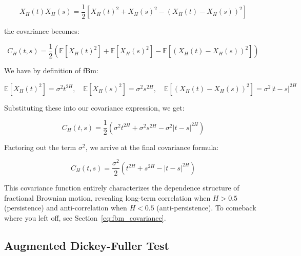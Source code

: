 \documentclass[11pt]{extarticle}
\begin{document}
\[
X_H(t)X_H(s) = \frac{1}{2}\left[X_H(t)^2 + X_H(s)^2 - (X_H(t)-X_H(s))^2\right]
\]

the covariance becomes:

\[
C_H(t,s) = \frac{1}{2}\left(\mathbb{E}[X_H(t)^2]+\mathbb{E}[X_H(s)^2]-\mathbb{E}[(X_H(t)-X_H(s))^2]\right)
\]


We have by definition of fBm:

\[
\mathbb{E}[X_H(t)^2] = \sigma^2 t^{2H}, \quad \mathbb{E}[X_H(s)^2] = \sigma^2 s^{2H}, \quad \mathbb{E}[(X_H(t)-X_H(s))^2] = \sigma^2 |t-s|^{2H}
\]

Substituting these into our covariance expression, we get:

\[
C_H(t,s) = \frac{1}{2}\left(\sigma^2 t^{2H} + \sigma^2 s^{2H} - \sigma^2 |t-s|^{2H}\right)
\]


Factoring out the term \( \sigma^2 \), we arrive at the final covariance formula:

\[
\boxed{C_H(t,s) = \frac{\sigma^2}{2}\left(t^{2H} + s^{2H} - |t-s|^{2H}\right)}
\]

This covariance function entirely characterizes the dependence structure of fractional Brownian motion, revealing long-term correlation when \(H>0.5\) (persistence) and anti-correlation when \(H<0.5\) (anti-persistence).
To comeback where you left off, see Section~\ref{eq:fbm_covariance}. \\

\subsection{Augmented Dickey-Fuller Test}

\begin{table}[h!]
    \centering
    \caption{P-values from the Augmented Dickey-Fuller (ADF) test for stationarity. The P-value of log prices refers to the Augmented Dickey Fuller test (ADF) on log prices,
     while the P-value of log-differentiated prices indicates the ADF test on log-differentiated returns. The null hypothesis is non-stationarity.
    To come back where you left off, see Section~\ref{sec:data}}
    \label{table:adf_results}
\end{table}
\end{document}
